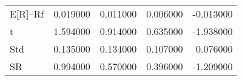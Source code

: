 \begin{tabular}{lrrrr}
\toprule
\midrule
E[R]--Rf & 0.019000 & 0.011000 & 0.006000 & -0.013000 \\
t & 1.594000 & 0.914000 & 0.635000 & -1.938000 \\
Std & 0.135000 & 0.134000 & 0.107000 & 0.076000 \\
SR & 0.994000 & 0.570000 & 0.396000 & -1.209000 \\
\bottomrule
\end{tabular}
